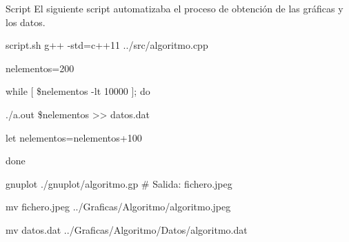\documentclass[compress]{beamer}
\begin{document}
\begin{frame}
	\begin{block}{Script}
		El siguiente script automatizaba el proceso de obtención de las gráficas y los 				datos.		
	\end{block}
	
	\begin{exampleblock}{script.sh}
		g++ -std=c++11 ../src/algoritmo.cpp
		
		nelementos=200
				
		while [ 	\$nelementos -lt 10000 ]; do
		
    		\hspace{0.75cm}	./a.out \$nelementos >> datos.dat
    			
    		\hspace{0.75cm}	let nelementos=nelementos+100
    			
		done
		

		gnuplot ./gnuplot/algoritmo.gp \# Salida: fichero.jpeg
		
		mv fichero.jpeg ../Graficas/Algoritmo/algoritmo.jpeg
		
		mv datos.dat ../Graficas/Algoritmo/Datos/algoritmo.dat
	\end{exampleblock}
	
\end{frame}
\end{document}
